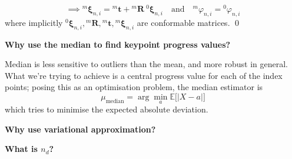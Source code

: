 \begin{equation}
    \implies
    {}^{m}\boldsymbol{\xi}_{n, i}
    =
    {}^{m}\boldsymbol{t} + {}^{m}\boldsymbol{R} \ {}^{0}\boldsymbol{\xi}_{n, i}
    \quad \text{and} \quad
    \boxed{
    {}^{m}\varphi_{n, i}
                =
                {}^{0}\varphi_{n, i}
        }
\end{equation}
where implicitly \( {}^{0}\boldsymbol{\xi}_{n, i}, {}^{m}\boldsymbol{R}, {}^{m}\boldsymbol{t}, {}^{m}\boldsymbol{\xi}_{n, i} \) are conformable matrices.
\qed{}

\vspace{1em}
\textbf{Why use the median to find keypoint progress values?}

Median is less sensitive to outliers than the mean, and more robust in general.
What we're trying to achieve is a central progress value for each of the index points; posing this as an optimisation problem, the median estimator is
\begin{equation}
    \mu_{\text{median}} = \arg \min_{a} \mathbb{E} \Big[ \big \vert X - a \big \vert \Big]
\end{equation}
which tries to minimise the expected absolute deviation.

\vspace{1em}
\textbf{Why use variational approximation?}

\vspace{1em}
\textbf{What is \( n_d \)?}
